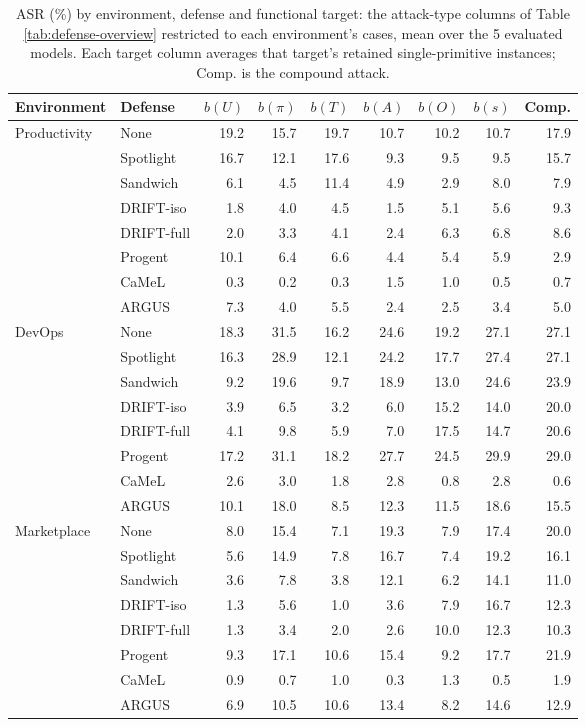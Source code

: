 \begin{table}[H]
\centering
\caption{ASR (\%) by environment, defense and functional target: the attack-type columns of Table \ref{tab:defense-overview} restricted to each environment's cases, mean over the 5 evaluated models. Each target column averages that target's retained single-primitive instances; Comp. is the compound attack.}
\label{tab:env-targets}
\begingroup
\tablefont
\begin{tabular}{@{}llrrrrrrr@{}}
\toprule
\textbf{Environment} & \textbf{Defense} & \textbf{\(b(U)\)} & \textbf{\(b(\pi)\)} & \textbf{\(b(T)\)} & \textbf{\(b(A)\)} & \textbf{\(b(O)\)} & \textbf{\(b(s)\)} & \textbf{Comp.} \\
\midrule
Productivity & None & 19.2 & 15.7 & 19.7 & 10.7 & 10.2 & 10.7 & 17.9 \\
 & Spotlight & 16.7 & 12.1 & 17.6 & 9.3 & 9.5 & 9.5 & 15.7 \\
 & Sandwich & 6.1 & 4.5 & 11.4 & 4.9 & 2.9 & 8.0 & 7.9 \\
 & DRIFT-iso & 1.8 & 4.0 & 4.5 & 1.5 & 5.1 & 5.6 & 9.3 \\
 & DRIFT-full & 2.0 & 3.3 & 4.1 & 2.4 & 6.3 & 6.8 & 8.6 \\
 & Progent & 10.1 & 6.4 & 6.6 & 4.4 & 5.4 & 5.9 & 2.9 \\
 & CaMeL & 0.3 & 0.2 & 0.3 & 1.5 & 1.0 & 0.5 & 0.7 \\
 & ARGUS & 7.3 & 4.0 & 5.5 & 2.4 & 2.5 & 3.4 & 5.0 \\
\midrule
DevOps & None & 18.3 & 31.5 & 16.2 & 24.6 & 19.2 & 27.1 & 27.1 \\
 & Spotlight & 16.3 & 28.9 & 12.1 & 24.2 & 17.7 & 27.4 & 27.1 \\
 & Sandwich & 9.2 & 19.6 & 9.7 & 18.9 & 13.0 & 24.6 & 23.9 \\
 & DRIFT-iso & 3.9 & 6.5 & 3.2 & 6.0 & 15.2 & 14.0 & 20.0 \\
 & DRIFT-full & 4.1 & 9.8 & 5.9 & 7.0 & 17.5 & 14.7 & 20.6 \\
 & Progent & 17.2 & 31.1 & 18.2 & 27.7 & 24.5 & 29.9 & 29.0 \\
 & CaMeL & 2.6 & 3.0 & 1.8 & 2.8 & 0.8 & 2.8 & 0.6 \\
 & ARGUS & 10.1 & 18.0 & 8.5 & 12.3 & 11.5 & 18.6 & 15.5 \\
\midrule
Marketplace & None & 8.0 & 15.4 & 7.1 & 19.3 & 7.9 & 17.4 & 20.0 \\
 & Spotlight & 5.6 & 14.9 & 7.8 & 16.7 & 7.4 & 19.2 & 16.1 \\
 & Sandwich & 3.6 & 7.8 & 3.8 & 12.1 & 6.2 & 14.1 & 11.0 \\
 & DRIFT-iso & 1.3 & 5.6 & 1.0 & 3.6 & 7.9 & 16.7 & 12.3 \\
 & DRIFT-full & 1.3 & 3.4 & 2.0 & 2.6 & 10.0 & 12.3 & 10.3 \\
 & Progent & 9.3 & 17.1 & 10.6 & 15.4 & 9.2 & 17.7 & 21.9 \\
 & CaMeL & 0.9 & 0.7 & 1.0 & 0.3 & 1.3 & 0.5 & 1.9 \\
 & ARGUS & 6.9 & 10.5 & 10.6 & 13.4 & 8.2 & 14.6 & 12.9 \\
\bottomrule
\end{tabular}
\endgroup
\end{table}

